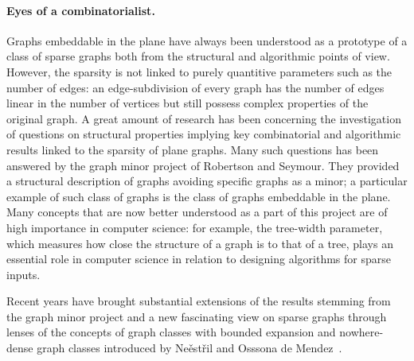 \paragraph*{Eyes of a combinatorialist.}

Graphs embeddable in the plane have always been understood as a prototype of a class of sparse graphs
both from the structural and algorithmic points of view.
However, the sparsity is not linked to purely quantitive parameters such as the number of edges:
an edge-subdivision of every graph has the number of edges linear in the number of vertices
but still possess complex properties of the original graph.
A great amount of research has been concerning the investigation of questions on structural properties
implying key combinatorial and algorithmic results linked to the sparsity of plane graphs.
Many such questions has been answered by the graph minor project of Robertson and Seymour.
They provided a structural description of graphs avoiding specific graphs as a minor;
a particular example of such class of graphs is the class of graphs embeddable in the plane.
Many concepts that are now better understood as a part of this project are of high importance in computer science:
for example, the tree-width parameter, which measures how close the structure of a graph is to that of a tree,
plays an essential role in computer science in relation to designing algorithms for sparse inputs.

Recent years have brought substantial extensions of the results stemming from the graph minor project and
a new fascinating view on sparse graphs through lenses of the concepts of graph classes with bounded expansion and
nowhere-dense graph classes introduced by Ne\v est\v ril and Osssona de Mendez~\cite{}.


